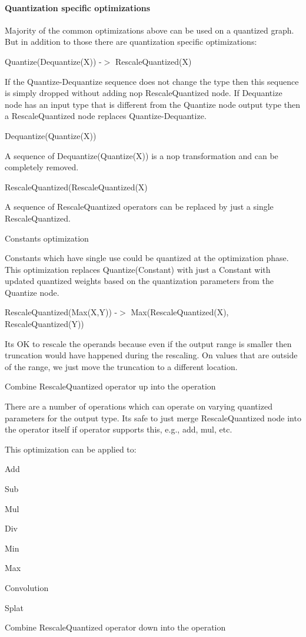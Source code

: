 \paragraph*{Quantization specific optimizations}

Majority of the common optimizations above can be used on a quantized graph. But in addition to those there are quantization specific optimizations\+:
\begin{DoxyItemize}
\item Quantize(\+Dequantize(\+X)) -\/$>$ Rescale\+Quantized(\+X)

If the Quantize-\/\+Dequantize sequence does not change the type then this sequence is simply dropped without adding nop Rescale\+Quantized node. If Dequantize node has an input type that is different from the Quantize node output type then a Rescale\+Quantized node replaces Quantize-\/\+Dequantize.
\item Dequantize(\+Quantize(\+X))

A sequence of Dequantize(\+Quantize(\+X)) is a nop transformation and can be completely removed.
\item Rescale\+Quantized(Rescale\+Quantized(\+X)

A sequence of Rescale\+Quantized operators can be replaced by just a single Rescale\+Quantized.
\item Constants optimization

Constants which have single use could be quantized at the optimization phase. This optimization replaces Quantize(\+Constant) with just a Constant with updated quantized weights based on the quantization parameters from the Quantize node.
\item Rescale\+Quantized(\+Max(\+X,\+Y)) -\/$>$ Max(Rescale\+Quantized(\+X), Rescale\+Quantized(\+Y))

It\textquotesingle{}s OK to rescale the operands because even if the output range is smaller then truncation would have happened during the rescaling. On values that are outside of the range, we just move the truncation to a different location.
\item Combine Rescale\+Quantized operator up into the operation

There are a number of operations which can operate on varying quantized parameters for the output type. It\textquotesingle{}s safe to just merge Rescale\+Quantized node into the operator itself if operator supports this, e.\+g., add, mul, etc.

This optimization can be applied to\+:
\begin{DoxyItemize}
\item Add
\item Sub
\item Mul
\item Div
\item Min
\item Max
\item Convolution
\item Splat
\end{DoxyItemize}
\item Combine Rescale\+Quantized operator down into the operation


\end{DoxyItemize}
